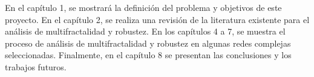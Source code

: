 En el capítulo 1, se mostrará la definición del problema y objetivos de este proyecto. En el capítulo 2, se realiza una revisión de la literatura existente para el análisis de multifractalidad y robustez. En los capítulos 4 a 7, se muestra el proceso de análisis de multifractalidad y robustez en algunas redes complejas seleccionadas. Finalmente, en el capítulo 8 se presentan las conclusiones y los trabajos futuros.